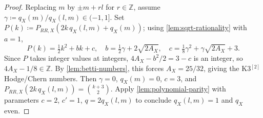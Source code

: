 \begin{proof}
  Replacing \(m\) by \(\pm m + rl\) for \(r \in \mathbb{Z}\), assume
  \(\gamma \coloneqq q_X(m)/q_X(l,m) \in (-1, 1]\).  Set
  \(P(k) \coloneqq P_{RR,X}(2k\,q_X(l,m) + q_X(m))\); using \cref{lem:sqrt-rationality}
  with \(a = 1\),
  \[
    P(k) = \tfrac{1}{2}k^2 + bk + c,
    \quad
    b = \tfrac{1}{2}\gamma + 2\sqrt{2A_X},
    \quad
    c = \tfrac{1}{8}\gamma^2 + \gamma\sqrt{2A_X} + 3.
  \]
  Since \(P\) takes integer values at integers, \(4A_X - b^2/2 = 3 - c\) is an integer,
  so \(4A_X - 1/8 \in \mathbb{Z}\).  By \cref{lem:betti-numbers}, this forces
  \(A_X = 25/32\), giving the K3\(^{[2]}\) Hodge/Chern numbers.  Then \(\gamma = 0\),
  \(q_X(m) = 0\), \(c = 3\), and \(P_{RR,X}(2k\,q_X(l,m)) = \binom{k+3}{2}\).
  Apply \cref{lem:polynomial-parity} with parameters \(c = 2\), \(c' = 1\),
  \(q = 2q_X(l,m)\) to conclude \(q_X(l,m) = 1\) and \(q_X\) even.
\end{proof}

